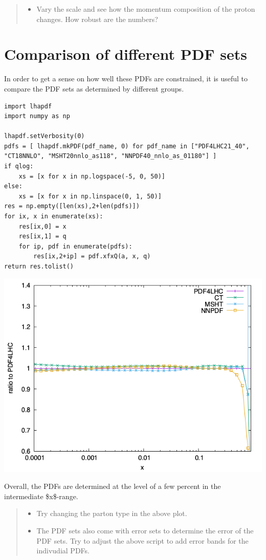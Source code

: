 \documentclass[11pt]{article}
\begin{document}
\begin{quote}
\begin{itemize}
\item Vary the scale and see how the momentum composition of the proton changes.
How robust are the numbers?
\end{itemize}
\end{quote}
\section{Comparison of different PDF sets}
\label{sec:org37162c2}
In order to get a sense on how well these PDFs are constrained, it is useful to compare the PDF sets as determined by different groups.

\begin{verbatim}
import lhapdf
import numpy as np

lhapdf.setVerbosity(0)
pdfs = [ lhapdf.mkPDF(pdf_name, 0) for pdf_name in ["PDF4LHC21_40", "CT18NNLO", "MSHT20nnlo_as118", "NNPDF40_nnlo_as_01180"] ]
if qlog:
    xs = [x for x in np.logspace(-5, 0, 50)]
else:
    xs = [x for x in np.linspace(0, 1, 50)]
res = np.empty([len(xs),2+len(pdfs)])
for ix, x in enumerate(xs):
    res[ix,0] = x
    res[ix,1] = q
    for ip, pdf in enumerate(pdfs):
        res[ix,2+ip] = pdf.xfxQ(a, x, q)
return res.tolist()
\end{verbatim}

\begin{center}
\includegraphics[width=.9\linewidth]{pdf_PDFcomp.png}
\label{}
\end{center}

Overall, the PDFs are determined at the level of a few percent in the intermediate \$x\$-range.

\begin{quote}
\begin{itemize}
\item Try changing the parton type in the above plot.
\item The PDF sets also come with error sets to determine the error of the PDF sets.
Try to adjust the above script to add error bands for the indivudial PDFs.
\end{itemize}
\end{quote}
\end{document}
